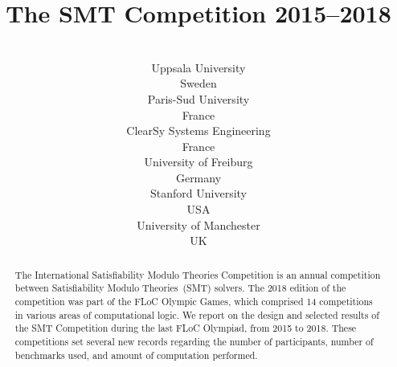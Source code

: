 \documentclass[dvipsnames,table,twoside,11pt]{article}
\begin{document}
\title{The SMT Competition 2015--2018}

\author{%
   \\
  \addr Uppsala University \\
  Sweden
  \AND
   \\
  \addr Paris-Sud University \\
  France
  \AND
   \\
  \addr ClearSy Systems Engineering \\
  France
  \AND
   \\
  \addr University of Freiburg \\
  Germany
  \AND
   \\
  \addr Stanford University\\
  USA
  \AND
   \\
  \addr University of Manchester \\
  UK}

\maketitle


\begin{abstract}
  The International Satisfiability Modulo Theories Competition is an
  annual competition between Satisfiability Modulo Theories~(SMT)
  solvers.  The 2018 edition of the competition was part of the FLoC
  Olympic Games, which comprised 14 competitions in various areas of
  computational logic.  We report on the design and selected results
  of the SMT Competition during the last FLoC Olympiad, from 2015 to
  2018.  These competitions set several new records regarding the
  number of participants, number of benchmarks used, and amount of
  computation performed.
\end{abstract}
\end{document}
